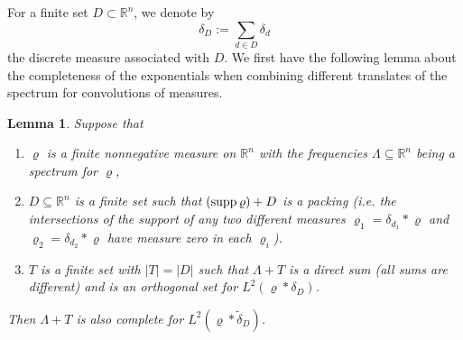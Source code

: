 \documentclass[reqno,a4paper,12pt]{amsart}
\numberwithin{equation}{section}
\newcommand{\Abs}[1]{{\left|{#1}\right|}}
\newcommand{\RR}{{\mathbb R}}
\newcounter{rem}
\newtheorem{lemma}[theorem]{Lemma}
\theoremstyle{remark}
\numberwithin{equation}{section}
\DeclareMathOperator\supp{\rm supp}
\def\red#1{\textcolor[rgb]{1.00,0.00,0.00}{#1}}
\begin{document}
{For a finite set $D\subset \mathbb{R}^n$, we denote by
\[
{\delta}_D:=\sum_{d\in D}\delta_d
\]
the  discrete measure associated with $D$.  We first have the following lemma about the completeness of the exponentials when combining different translates of the spectrum for convolutions of measures. 

\begin{lemma}\label{lm:conv}
Suppose that
\begin{enumerate}
\item $\varrho$ is a finite nonnegative measure on $\RR^n$ with the frequencies $\Lambda \subseteq \RR^n$ being a spectrum for $\varrho$,
\item $D \subseteq \RR^n$ is a finite set such that $(\supp\varrho) + D$ is a packing (i.e. the intersections of the support of any two different measures $\varrho_1=\delta_{d_1}\ast\varrho$ and $\varrho_2 = \delta_{d_2}\ast\varrho$ have measure zero in each $\varrho_i$).
\item $T$ is a finite set with $\Abs{T} = \Abs{D}$ such that $\Lambda+T$ is a direct sum (all sums are different) and is an orthogonal set for $L^2(\varrho*{\delta}_D)$.
\end{enumerate}
Then $\Lambda+T$ is also complete for $L^2(\varrho*\widetilde{\delta}_D)$.
\end{lemma}


}
\end{document}
